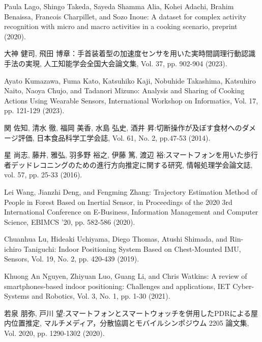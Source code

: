 \begin{thebibliography}{参考文献}
	Paula Lago, Shingo Takeda, Sayeda Shamma Alia, Kohei Adachi, Brahim Benaissa, Francois Charpillet, and Sozo Inoue: A dataset for complex activity recognition with micro and macro activities in a cooking scenario, preprint (2020).

	大神 健司, 飛田 博章：手首装着型の加速度センサを用いた実時間調理行動認識手法の実現, 人工知能学会全国大会論文集, Vol. 37, pp. 902-904 (2023).

	Ayato Kumazawa, Fuma Kato, Katsuhiko Kaji, Nobuhide Takashima, Katsuhiro Naito, Naoya Chujo, and Tadanori Mizuno:
	Analysis and Sharing of Cooking Actions Using Wearable Sensors, International Workshop on Informatics, Vol. 17, pp. 121-129 (2023).

	関 佐知, 清水 徹, 福岡 美香, 水島 弘史, 酒井 昇:切断操作が及ぼす食材へのダメージ評価, 日本食品科学工学会誌, Vol. 61, No. 2, pp.47-53 (2014).
	

	星 尚志, 藤井, 雅弘, 羽多野 裕之, 伊藤 篤, 渡辺 裕:スマートフォンを用いた歩行者デッドレコニングのための進行方向推定に関する研究, 情報処理学会論文誌, vol. 57, pp. 25-33 (2016).

	Lei Wang, Jianzhi Deng, and Fengming Zhang: Trajectory Estimation Method of People in Forest Based on Inertial Sensor, in Proceedings of the 2020 3rd International Conference on E-Business, Information Management and Computer Science, EBIMCS ’20, pp. 582-586 (2020).

	Chuanhua Lu, Hideaki Uchiyama, Diego Thomas, Atushi Shimada, and Rin-ichiro Taniguchi: Indoor Positioning System Based on Chest-Mounted IMU, Sensors, Vol. 19, No. 2, pp. 420-439 (2019).

	Khuong An Nguyen, Zhiyuan Luo, Guang Li, and Chris Watkins: A review of smartphones-based indoor positioning: Challenges and applications, IET Cyber-Systems and Robotics, Vol. 3, No. 1, pp. 1-30 (2021).

	若泉 朋弥, 戸川 望:スマートフォンとスマートウォッチを併用したPDRによる屋内位置推定, マルチメディア，分散協調とモバイルシンポジウム 2205 論文集, Vol. 2020, pp. 1290-1302 (2020).



\end{thebibliography}
